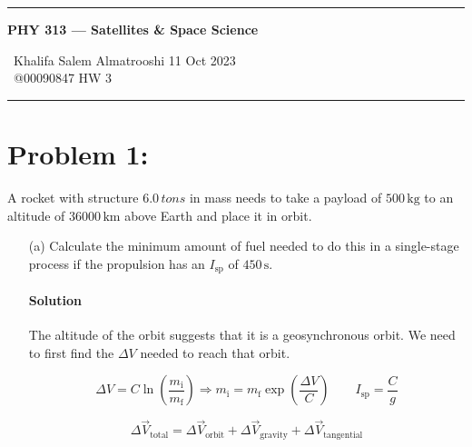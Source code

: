 \documentclass{article}
\begin{document}
	
	\begin{center}
		\hrule
		\vspace{0.4cm}
		{\textbf { \large PHY 313 --- Satellites \& Space Science}}
		\vspace{0.4cm}
	\end{center}
	{ \ Khalifa Salem Almatrooshi \hspace{\fill}  11 Oct 2023 \\
		{ } \ @00090847 \hspace{\fill}  HW 3 \\
		\hrule	

	\section*{Problem 1: }
	A rocket with structure $\num{6.0} \, \unit{tons}$ in mass needs to take a payload of $\num{500} \, \unit{\kilogram}$ to an altitude of $\num{36000} \, \unit{\kilo\meter}$ above Earth and place it in orbit. \\
	\begin{enumerate}
		\item[(a)] Calculate the minimum amount of fuel needed to do this in a single-stage process if the propulsion has an $I_\mathrm{sp}$ of $\num{450} \, \unit{\second}$.
		\paragraph{Solution} The altitude of the orbit suggests that it is a geosynchronous orbit. We need to first find the $\Delta V$ needed to reach that orbit.
		
		\[
			\Delta V = C \ln \left( \frac{m_{\mathrm{i}}}{m_{\mathrm{f}}} \right) \Rightarrow m_\mathrm{i} = m_\mathrm{f} \exp \left( \frac{\Delta V}{C} \right) \qquad I_\mathrm{sp} = \frac{C}{g}
		\]
		
		\[
			\Delta \vec{V}_{\mathrm{total}} = \Delta \vec{V}_{\mathrm{orbit}} + \Delta \vec{V}_{\mathrm{gravity}} + \Delta \vec{V}_{\mathrm{tangential}}
		\]
		

\end{enumerate}}
\end{document}

